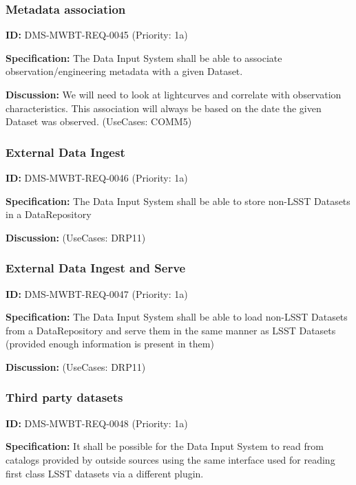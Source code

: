 \documentclass[SE,toc,lsstdraft]{lsstdoc}
\begin{document}
\subsubsection{Metadata association}

\label{DMS-MWBT-REQ-0045}
\textbf{ID:} DMS-MWBT-REQ-0045 (Priority: 1a)

\textbf{Specification:}
The Data Input System shall be able to associate observation/engineering metadata with a given Dataset.

\textbf{Discussion:}
We will need to look at lightcurves and correlate with observation characteristics. This association will always be based on the date the given Dataset was observed. (UseCases: COMM5)

\subsubsection{External Data Ingest}

\label{DMS-MWBT-REQ-0046}
\textbf{ID:} DMS-MWBT-REQ-0046 (Priority: 1a)

\textbf{Specification:}
The Data Input System shall be able to store non-LSST Datasets in a DataRepository

\textbf{Discussion:}
(UseCases: DRP11)

\subsubsection{External Data Ingest and Serve}

\label{DMS-MWBT-REQ-0047}
\textbf{ID:} DMS-MWBT-REQ-0047 (Priority: 1a)

\textbf{Specification:}
The Data Input System shall be able to load non-LSST Datasets from a DataRepository and serve them in the same manner as LSST Datasets (provided enough information is present in them)

\textbf{Discussion:}
(UseCases: DRP11)

\subsubsection{Third party datasets}

\label{DMS-MWBT-REQ-0048}
\textbf{ID:} DMS-MWBT-REQ-0048 (Priority: 1a)

\textbf{Specification:}
It shall be possible for the Data Input System to read from catalogs provided by outside sources using the same interface used for reading first class LSST datasets via a different plugin.
\end{document}
